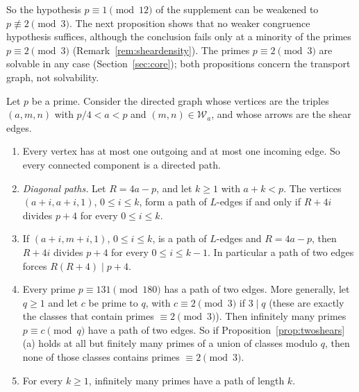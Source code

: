 So the hypothesis $p\equiv1\pmod{12}$ of the supplement can be weakened to $p\not\equiv2\pmod3$. The next proposition shows that no weaker congruence hypothesis suffices, although the conclusion fails only at a minority of the primes $p\equiv2\pmod3$ (Remark~\ref{rem:sheardensity}). The primes $p\equiv2\pmod3$ are solvable in any case (Section~\ref{sec:core}); both propositions concern the transport graph, not solvability.

\begin{proposition}\label{prop:sheargraph}
Let $p$ be a prime. Consider the directed graph whose vertices are the triples $(a,m,n)$ with $p/4<a<p$ and $(m,n)\in\mathcal W_a$, and whose arrows are the shear edges.
\begin{enumerate}[label=(\alph*)]
\item Every vertex has at most one outgoing and at most one incoming edge. So every connected component is a directed path.
\item \emph{Diagonal paths.} Let $R=4a-p$, and let $k\ge1$ with $a+k<p$. The vertices $(a+i,a+i,1)$, $0\le i\le k$, form a path of $L$-edges if and only if $R+4i$ divides $p+4$ for every $0\le i\le k$.
\item If $(a+i,m+i,1)$, $0\le i\le k$, is a path of $L$-edges and $R=4a-p$, then $R+4i$ divides $p+4$ for every $0\le i\le k-1$. In particular a path of two edges forces $R(R+4)\mid p+4$.
\item Every prime $p\equiv131\pmod{180}$ has a path of two edges. More generally, let $q\ge1$ and let $c$ be prime to $q$, with $c\equiv2\pmod3$ if $3\mid q$ (these are exactly the classes that contain primes $\equiv2\pmod3$). Then infinitely many primes $p\equiv c\pmod q$ have a path of two edges. So if Proposition~\ref{prop:twoshears}(a) holds at all but finitely many primes of a union of classes modulo $q$, then none of those classes contains primes $\equiv2\pmod3$.
\item For every $k\ge1$, infinitely many primes have a path of length $k$.
\end{enumerate}
\end{proposition}
